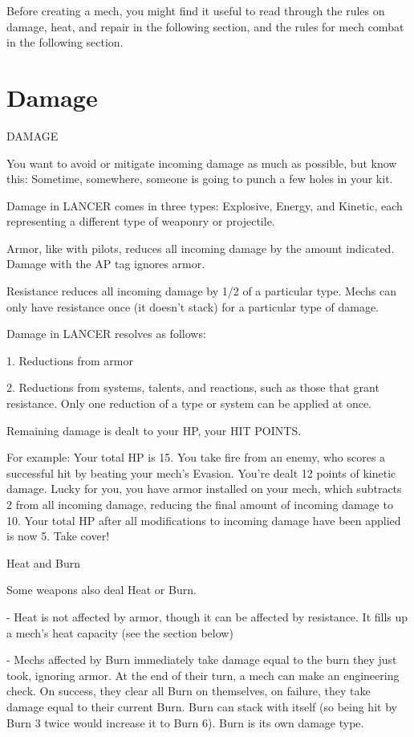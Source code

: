 Before creating a mech, you might find it useful to read through the rules on damage, heat, and  
repair in the following section, and the rules for mech combat in the following section.
 
\section{Damage}
 DAMAGE  

You want to avoid or mitigate incoming damage as much as possible, but know this: Sometime,  
somewhere, someone is going to punch a few holes in your kit. 
 

Damage in LANCER comes in three types: Explosive, Energy, and Kinetic, each representing a  
different type of weaponry or projectile.
 

Armor, like with pilots, reduces all incoming damage by the amount indicated. Damage with the  
AP tag ignores armor. 
 
Resistance reduces all incoming damage by 1/2 of a particular type. Mechs can only have  
resistance once (it doesn’t stack) for a particular type of damage. 
 

Damage in LANCER resolves as follows:
 
             1.  Reductions from armor
 
             2.  Reductions from systems, talents, and reactions, such as those that grant  
                 resistance. Only one reduction of a type or system can be applied at once.
 
Remaining damage is dealt to your HP, your HIT POINTS. 
 

For example: Your total HP is  15. You take fire from an enemy, who scores a successful hit by  
beating your mech’s Evasion. You’re dealt 12 points of kinetic damage. Lucky for you, you have  
armor installed on your mech, which subtracts 2 from all incoming damage, reducing the final  
amount of incoming damage to  10. Your total HP after all modifications to incoming damage  
have been applied is now 5. Take cover!   

                                               Heat and Burn  

Some weapons also deal Heat or Burn. 
 
    -    Heat is not affected by armor, though it can be affected by resistance. It fills up a mech’s  
         heat capacity (see the section below)
 
    -    Mechs affected by Burn immediately take damage equal to the burn they just took,  
         ignoring armor. At the end of their turn, a mech can make an engineering check. On  
        success, they clear all Burn on themselves, on failure, they take damage equal to their  
        current Burn. Burn can stack with itself (so being hit by Burn 3 twice would increase it to  
         Burn 6). Burn is its own damage type.
 
